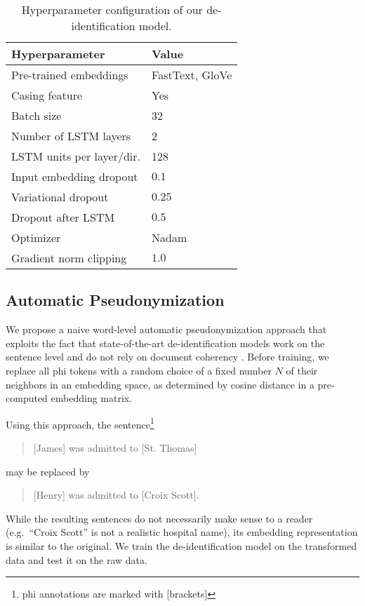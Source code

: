 \begin{table}
    \centering
    \begin{tabular}{ll}
     \toprule
     Hyperparameter & Value\\
     \midrule
     Pre-trained embeddings & FastText, GloVe\\
     Casing feature & Yes\\
     Batch size & 32\\
     Number of LSTM layers & 2\\
     LSTM units per layer/dir. & 128\\
     Input embedding dropout & $0.1$\\
     Variational dropout & $0.25$\\
     Dropout after LSTM & $0.5$\\
     Optimizer & Nadam\\
     Gradient norm clipping & $1.0$\\
     \bottomrule
    \end{tabular}
    \caption{Hyperparameter configuration of our de-identification model.}\label{tab:deid-hyperparameters}
\end{table}


\subsection{Automatic Pseudonymization}\label{sec:automatic-pseudonymization}
%
We propose a naive word-level automatic pseudonymization approach that exploits the fact that state-of-the-art de-identification models work on the sentence level and do not rely on document coherency \citep{liu2017identification,dernoncourt2017identification}.
%
Before training, we replace all \ac{phi} tokens with a random choice of a fixed number $N$ of their neighbors in an embedding space, as determined by cosine distance in a pre-computed embedding matrix.
%

%
Using this approach, the sentence\footnote{\ac{phi} annotations are marked with [brackets]}
%
\begin{quote}
    [James] was admitted to [St. Thomas]
\end{quote}
%
may be replaced by
\begin{quote}
    [Henry] was admitted to [Croix Scott].
\end{quote}
%
While the resulting sentences do not necessarily make sense to a reader (e.g.\ ``Croix Scott'' is not a realistic hospital name), its embedding representation is similar to the original.
%
We train the de-identification model on the transformed data and test it on the raw data.


